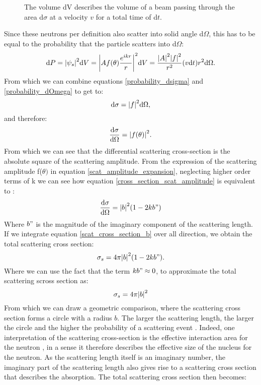 \begin{figure}
	\centering
	\def\svgwidth{\textwidth}
	
	\caption{The volume dV describes the volume of a beam passing through the area d$\sigma$ at a velocity $v$ for a total time of d$t$.}
	\label{volume_dsigma}
\end{figure}
Since these neutrons per definition also scatter into solid angle d$\Omega$, this has to be equal to the probability that the particle scatters into d$\Omega$:
\begin{equation}\label{probability_dOmega}
	\dd P = \abs{\psi_s}^2 \dd V = \abs{Af(\theta) \frac{e^{ikr}}{r}}^2 \dd V = \frac{\abs{A}^2\abs{f}^2}{r^2}(v\dd t) r^2 \dd \Omega. 
\end{equation}
From which we can combine equations \ref{probability_dsigma} and \ref{probability_dOmega} to get to:
\begin{equation}
	\dd \sigma = \abs{f}^2 \dd\Omega,
\end{equation}
and therefore:
\begin{equation}\label{cross_section_scat_amplitude}
	\frac{\dd\sigma}{\dd\Omega} = \abs{f(\theta)}^2.
\end{equation}
From which we can see that the differential scattering cross-section is the absolute square of the scattering amplitude. From the expression of the scattering amplitude f($\theta)$ in equation  \ref{scat_amplitude_expansion}, neglecting higher order terms of k we can see how equation \ref{cross_section_scat_amplitude} is equivalent to \cite{cross_section_detailed}:
\begin{equation}\label{scat_cross_section_b}
	\frac{\dd \sigma}{\dd \Omega} = \abs{b}^2 (1-2kb")
\end{equation}
Where $b"$ is the magnitude of the imaginary component of the scattering length. If we integrate equation \ref{scat_cross_section_b} over all direction, we obtain the total scattering cross section:
\begin{equation}
	\sigma_s = 4\pi \abs{b}^2\qty(1-2kb").
\end{equation}
Where we can use the fact that the term $kb" \approx 0$, to approximate the total scattering scross section as:
\begin{equation}
	\sigma_s = 4\pi\abs{b}^2
\end{equation}
From which we can draw a geometric comparison, where the scattering cross section forms a circle with a radius $b$. The larger the scattering length, the larger the circle and the higher the probability of a scattering event \cite{scattering_length_radius}. Indeed, one interpretation of the scattering cross-section is the effective interaction area for the neutron \cite{rutherford}, in a sense it therefore describes the effective size of the nucleus for the neutron. As the scattering length itself is an imaginary number, the imaginary part of the scattering length also gives rise to a scattering cross section that describes the absorption. The total scattering cross section then becomes:
